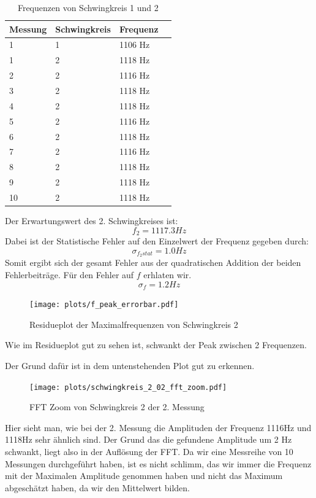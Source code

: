 \documentclass[twoside]{protokoll}
\begin{document}
\begin{table}[H]
    \centering
    \begin{tabularx}{1\textwidth}{X X X X} %
        \toprule
        \textbf{Messung} & \textbf{Schwingkreis} & \textbf{Frequenz} \\
        \midrule
        1 & 1 & 1106 Hz \\
        \midrule
        1 & 2 & 1118 Hz \\
        2 & 2 & 1116 Hz \\
        3 & 2 & 1118 Hz \\
        4 & 2 & 1118 Hz \\
        5 & 2 & 1116 Hz \\
        6 & 2 & 1118 Hz \\
        7 & 2 & 1116 Hz \\
        8 & 2 & 1118 Hz \\
        9 & 2 & 1118 Hz \\
        10& 2 & 1118 Hz \\
        \bottomrule
    \end{tabularx}
    \caption{Frequenzen von Schwingkreis 1 und 2}
\end{table}

Der Erwartungswert des 2. Schwingkreises ist:
\begin{equation}
    f_2 = 1117.3 Hz
\end{equation}
Dabei ist der Statistische Fehler auf den Einzelwert der Frequenz gegeben durch:
\begin{equation}
    \sigma_{f_2 stat} = 1.0 Hz
\end{equation}
Somit ergibt sich der gesamt Fehler aus der quadratischen Addition der beiden Fehlerbeiträge. Für den Fehler auf $f$ erhlaten wir.
\begin{equation}
\sigma_f = 1.2Hz
\end{equation}

\begin{figure}[H]
    \centering
    \texttt{[image: plots/f\_peak\_errorbar.pdf]}
    \caption{Residueplot der Maximalfrequenzen von Schwingkreis 2}
\end{figure}
Wie im Residueplot gut zu sehen ist, schwankt der Peak zwischen 2 Frequenzen.
 
Der Grund dafür ist in dem untenstehenden Plot gut zu erkennen.
\begin{figure}[H]
    \centering
    \texttt{[image: plots/schwingkreis\_2\_02\_fft\_zoom.pdf]}
    \caption{FFT Zoom von Schwingkreis 2 der 2. Messung}
    \label{fig:peak}
\end{figure}
Hier sieht man, wie bei der 2. Messung die Amplituden der Frequenz 1116Hz und 1118Hz sehr ähnlich sind.
Der Grund das die gefundene Amplitude um 2 Hz schwankt, liegt also in der Auflösung der FFT.
Da wir eine Messreihe von 10 Messungen durchgeführt haben, ist es nicht schlimm, das wir immer die Frequenz mit der Maximalen Amplitude genommen haben und nicht das Maximum abgeschätzt haben,
da wir den Mittelwert bilden.  \\
\end{document}

